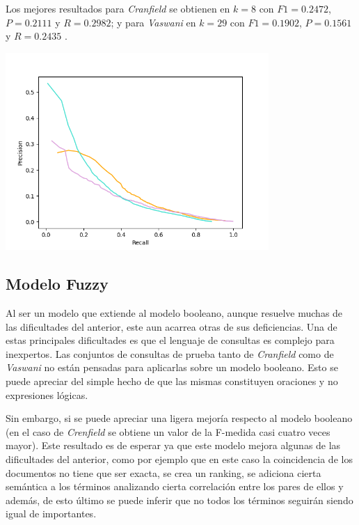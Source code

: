 \documentclass{llncs}
\begin{document}
    Los mejores resultados para \emph{Cranfield} se obtienen en $k = 8$ con $F1 = 0.2472$, $P = 0.2111$ y $R = 0.2982$; y para \emph{Vaswani} en $k = 29$ con $F1 = 0.1902$, $P = 0.1561$ y $R = 0.2435$ .

    \begin{center}
        \includegraphics[width=10cm]{PR_plot(all).png}    
    \end{center}

	\subsection{Modelo Fuzzy}
	
	Al ser un modelo que extiende al modelo booleano, aunque resuelve muchas de las dificultades del anterior, este aun acarrea otras de sus deficiencias. Una de estas principales dificultades es que el lenguaje de consultas es complejo para inexpertos. Las conjuntos de consultas de prueba tanto de \emph{Cranfield} como de \emph{Vaswani} no est\'an pensadas para aplicarlas sobre un modelo booleano. Esto se puede apreciar del simple hecho de que las mismas constituyen oraciones y no expresiones l\'ogicas.
	
	Sin embargo, si se puede apreciar una ligera mejor\'ia respecto al modelo booleano (en el caso de \emph{Crenfield} se obtiene un valor de la F-medida casi cuatro veces mayor). Este resultado es de esperar ya que este modelo mejora algunas de las dificultades del anterior, como por ejemplo que en este caso la coincidencia de los documentos no tiene que ser exacta, se crea un ranking, se adiciona cierta sem\'antica a los t\'erminos analizando cierta correlaci\'on entre los pares de ellos y adem\'as, de esto \'ultimo se puede inferir que no todos los t\'erminos seguir\'an siendo igual de importantes.
	 
\end{document}

